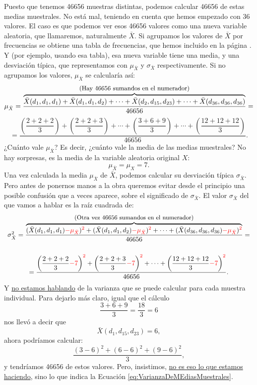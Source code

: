 \begin{itemize}
\begin{ejemplo}
        Puesto que tenemos 46656 muestras distintas, podemos calcular 46656 de estas medias muestrales. No está mal, teniendo en cuenta que hemos empezado con 36 valores. El caso es que podemos ver esos 46656 valores como una nueva variable aleatoria, que llamaremos, naturalmente $\bar X$. Si agrupamos los valores de $\bar X$ por frecuencias se obtiene una tabla de frecuencias, que hemos incluido en la página \pageref{subsec:TablaFrecuenciasMediasMuestrales}. Y (por ejemplo, usando esa tabla),  esa nueva variable tiene una media, y una desviación típica, que representamos con $\mu_{\bar X}$ y $\sigma_{\bar X}$ respectivamente. Si no agrupamos los valores, $\mu_{\bar X}$ se calcularía así:
        \[\mu_{\bar X}=
        \dfrac{\overbrace{\bar X(d_1,d_1,d_1)+\bar X(d_1,d_1,d_2)+\cdots+\bar X(d_2,d_{15},d_{23})+\cdots+\bar X(d_{36},d_{36},d_{36})}^{\mbox{\small(Hay 46656 sumandos en el numerador)}} }{46656}=
        \]
        \[=\dfrac{\left(\dfrac{2+2+2}{3}\right)+\left(\dfrac{2+2+3}{3}\right)+\cdots+\left(\dfrac{3+6+9}{3}\right)+\cdots+\left(\dfrac{12+12+12}{3}\right)}{46656}.\]
        ¿Cuánto vale $\mu_{\bar X}$? Es decir, ¿cuánto vale la media de las medias muestrales? No hay sorpresas, es la media de la variable aleatoria original $X$:
        \[\mu_{\bar X}=\mu_X=7.\]
        Una vez calculada la media $\mu_{\bar X}$ de $\bar X$, podemos calcular su desviación típica $\sigma_{\bar X}$. Pero antes de ponernos manos a la obra queremos evitar desde el principio una posible confusión que a veces aparece, sobre el significado de $\sigma_{\bar X}$. El valor $\sigma_{\bar X}$ del que vamos a hablar es la raíz cuadrada de:
        \begin{equation}\label{eq:VarianzaDeMEdiasMuestrales}
        \begin{array}{c}
        \sigma^2_{\bar X}=
        \dfrac{\overbrace{
        (\bar X(d_1,d_1,d_1)\textcolor{red}{-\mu_{\bar X}})^{\textcolor{red}{2}}+
        (\bar X(d_1,d_1,d_2)\textcolor{red}{-\mu_{\bar X}})^{\textcolor{red}{2}}+
        \cdots+
        (\bar X(d_{36},d_{36},d_{36})\textcolor{red}{-\mu_{\bar X}})^{\textcolor{red}{2}}
        }^{\mbox{\small(Otra vez 46656 sumandos en el numerador)}} }{46656}=
        \\[8mm]
        =\dfrac{\left(\dfrac{2+2+2}{3}\textcolor{red}{-7}\right)^{\textcolor{red}{2}}+\left(\dfrac{2+2+3}{3}\textcolor{red}{-7}\right)^{\textcolor{red}{2}}+
        \cdots+\left(\dfrac{12+12+12}{3}\textcolor{red}{-7}\right)^{\textcolor{red}{2}}}{46656}.
        \end{array}
        \end{equation}
        Y \underline{no estamos hablando} de la varianza que se puede calcular para cada muestra individual. Para dejarlo más claro, igual que el cálculo
        \[\dfrac{3+6+9}{3}=\dfrac{18}{3}=6\]
        nos llevó a decir que
        \[\bar X(d_1,d_{15},d_{23})=6,\]
        ahora podríamos calcular:
        \[\dfrac{(3-6)^2+(6-6)^2+(9-6)^2}{3},\]
        y tendríamos 46656 de estos valores. Pero, insistimos, \underline{no es eso lo que estamos haciendo}, sino lo que indica la Ecuación \ref{eq:VarianzaDeMEdiasMuestrales}.




\end{ejemplo}
\end{itemize}
